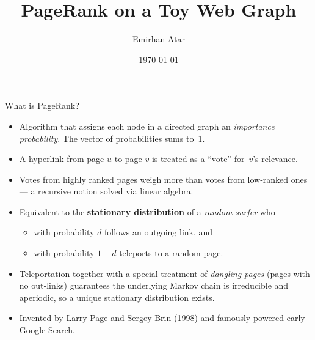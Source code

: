 \documentclass{beamer}
\title{PageRank on a Toy Web Graph}
\author{Emirhan Atar}
\institute{Discrete Mathematics II — 2025S}
\date{\today}
\begin{document}
\begin{frame}
\titlepage
\end{frame}

\begin{frame}{What is PageRank?}
\begin{itemize}
  \item Algorithm that assigns each node in a directed graph an \emph{importance probability}.  The vector of probabilities sums to~1.
  \item A hyperlink from page $u$ to page $v$ is treated as a “vote” for~$v$’s relevance.
  \item Votes from highly ranked pages weigh more than votes from low‑ranked ones — a recursive notion solved via linear algebra.
  \item Equivalent to the \textbf{stationary distribution} of a \emph{random surfer} who
  \begin{itemize}
    \item with probability $d$ follows an outgoing link, and
    \item with probability $1-d$ teleports to a random page.
  \end{itemize}
  \item Teleportation together with a special treatment of \emph{dangling pages} (pages with no out‑links) guarantees the underlying Markov chain is irreducible and aperiodic, so a unique stationary distribution exists.
  \item Invented by Larry Page and Sergey Brin (1998) and famously powered early Google Search.
\end{itemize}
\end{frame}
\end{document}
